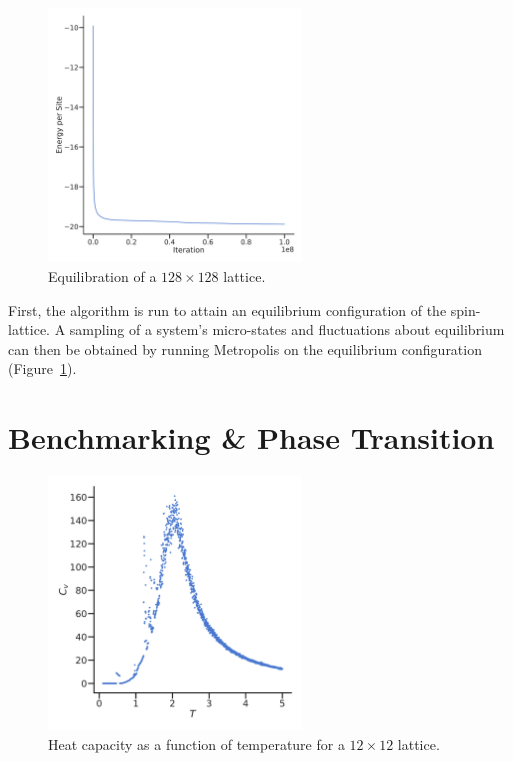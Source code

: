 \documentclass[11pt]{article}
\begin{document}
    \begin{figure}
        \centering
        \includegraphics[width=0.6\textwidth]{../Python/eq.pdf}

        \caption{Equilibration of a $128 \times 128$ lattice. }
        \label{fig:eq}
    \end{figure}

First, the algorithm is run to attain an equilibrium configuration of the spin-lattice.
A sampling of a system's micro-states and fluctuations about equilibrium can then be obtained
by running Metropolis on the equilibrium configuration (Figure~\ref{fig:eq}).

    \newpage

\section*{Benchmarking \& Phase Transition}

    \begin{figure}
        \centering
        \includegraphics[width=0.6\textwidth]{../Python/heat_cap.pdf}

        \caption{Heat capacity as a function of temperature for a $12 \times 12$ lattice.}
        \label{fig:heat_cap}
    \end{figure}
\end{document}

